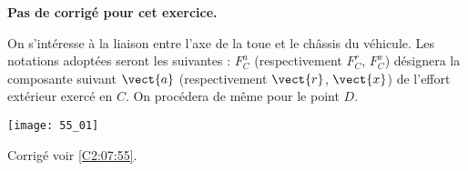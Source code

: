 \normalfalse \difficiletrue \tdifficilefalse
\correctionfalse


\setcounter{numques}{0}
\ifcorrection
\else
\textbf{Pas de corrigé pour cet exercice.}
\fi

\ifprof
\else
On s'intéresse à la liaison entre l'axe de la toue et le châssis du véhicule. Les notations adoptées seront les suivantes : $F^a_{C}$ (respectivement $F^r_{C}$, $F^x_{C}$) désignera la composante suivant $\vect{a}$ (respectivement $\vect{r}$, $\vect{x}$) de l'effort extérieur exercé en $C$. On procédera de même pour le point $D$. 
\begin{center}
\texttt{[image: 55\_01]}
\end{center}


\fi

\ifprof
\else
\fi



\ifprof
\else
\fi
\ifprof
\else
\begin{flushright}
\footnotesize{Corrigé  voir \ref{C2:07:55}.}
\end{flushright}%
\fi 